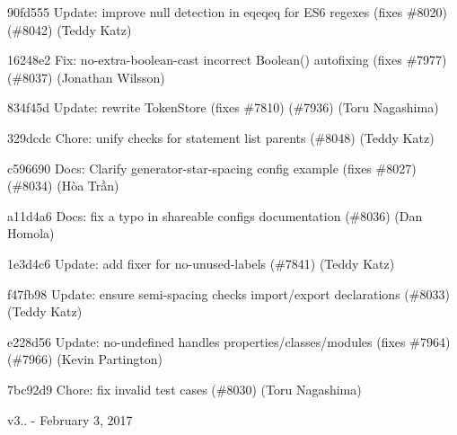 \begin{DoxyItemize}
\item 90fd555 Update\+: improve null detection in eqeqeq for E\+S6 regexes (fixes \#8020) (\#8042) (Teddy Katz)
\item 16248e2 Fix\+: no-\/extra-\/boolean-\/cast incorrect Boolean() autofixing (fixes \#7977) (\#8037) (Jonathan Wilsson)
\item 834f45d Update\+: rewrite Token\+Store (fixes \#7810) (\#7936) (Toru Nagashima)
\item 329dcdc Chore\+: unify checks for statement list parents (\#8048) (Teddy Katz)
\item c596690 Docs\+: Clarify generator-\/star-\/spacing config example (fixes \#8027) (\#8034) (Hòa Trần)
\item a11d4a6 Docs\+: fix a typo in shareable configs documentation (\#8036) (Dan Homola)
\item 1e3d4c6 Update\+: add fixer for no-\/unused-\/labels (\#7841) (Teddy Katz)
\item f47fb98 Update\+: ensure semi-\/spacing checks import/export declarations (\#8033) (Teddy Katz)
\item e228d56 Update\+: no-\/undefined handles properties/classes/modules (fixes \#7964) (\#7966) (Kevin Partington)
\item 7bc92d9 Chore\+: fix invalid test cases (\#8030) (Toru Nagashima)
\end{DoxyItemize}

v3.. -\/ February 3, 2017


